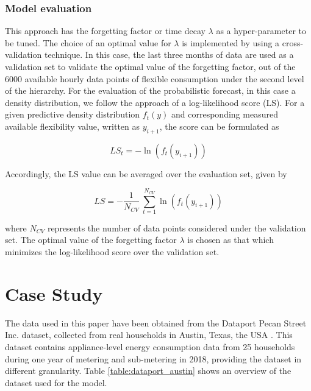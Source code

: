 \subsubsection{Model evaluation}
This approach has the forgetting factor or time decay $\lambda$ as a hyper-parameter to be tuned. The choice of an optimal value for $\lambda$ is implemented by using a cross-validation technique. In this case, the last three months of data are used as a validation set to validate the optimal value of the forgetting factor, out of the 6000 available hourly data points of flexible consumption under the second level of the hierarchy. For the evaluation of the probabilistic forecast, in this case a density distribution, we follow the approach of a log-likelihood score (LS). For a given predictive density distribution $f_{t}(y)$ and corresponding measured available flexibility value, written as $y_{i+1}$, the score can be formulated as

\begin{equation}
    LS_{t} = - \ln \left(f_{t}(y_{i+1})\right)
\end{equation}

Accordingly, the LS value can be averaged over the evaluation set, given by 

\begin{equation}
    LS = - \frac{1}{N_{CV}} \ \sum_{t=1}^{N_{CV}} \ln \left(f_{t}(y_{i+1})\right)
\end{equation}

where $N_{CV}$ represents the number of data points considered under the validation set.
The optimal value of the forgetting factor $\lambda$ is chosen as that which minimizes the log-likelihood score  over the validation set. 

\section{Case Study} \label{Sect:CaseStudy}
The data used in this paper have been obtained from the Dataport Pecan Street Inc. dataset, collected from real households in Austin, Texas, the USA \cite{PecanStreetInc}. This dataset contains appliance-level energy consumption data from 25 households during one year of metering and sub-metering in 2018, providing the dataset in different granularity. Table \ref{table:dataport_austin} shows an overview of the dataset used for the model.

